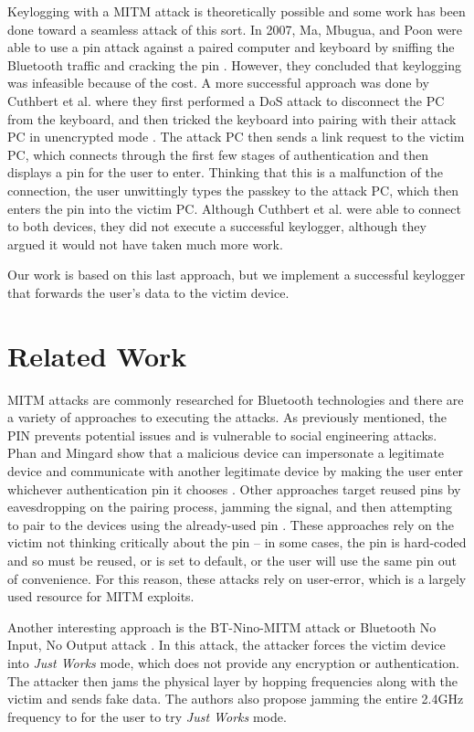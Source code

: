 \documentclass{acm_proc_article-sp}
\begin{document}
Keylogging with a MITM attack is theoretically possible and some work has been done toward a seamless attack of this sort. In 2007, Ma, Mbugua, and Poon were able to use a pin attack against a paired computer and keyboard by sniffing the Bluetooth traffic and cracking the pin \cite{ma2007keystroke}. However, they concluded that keylogging was infeasible because of the cost. A more successful approach was done by Cuthbert et al. where they first performed a DoS attack to disconnect the PC from the keyboard, and then tricked the keyboard into pairing with their attack PC in unencrypted mode \cite{cuthbertbluetooth}. The attack PC then sends a link request to the victim PC, which connects through the first few stages of authentication and then displays a pin for the user to enter. Thinking that this is a malfunction of the connection, the user unwittingly types the passkey to the attack PC, which then enters the pin into the victim PC. Although Cuthbert et al. were able to connect to both devices, they did not execute a successful keylogger, although they argued it would not have taken much more work. 

Our work is based on this last approach, but we implement a successful keylogger that forwards the user's data to the victim device.

\section{Related Work}
MITM attacks are commonly researched for Bluetooth technologies and there are a variety of approaches to executing the attacks. As previously mentioned, the PIN prevents potential issues and is vulnerable to social engineering attacks. Phan and Mingard show that a malicious device can impersonate a legitimate device and communicate with another legitimate device by making the user enter whichever authentication pin it chooses \cite{phan2012analyzing}. Other approaches target reused pins by eavesdropping on the pairing process, jamming the signal, and then attempting to pair to the devices using the already-used pin \cite{barnickel2012implementing,lindell2008attacks}. These approaches rely on the victim not thinking critically about the pin -- in some cases, the pin is hard-coded and so must be reused, or is set to default, or the user will use the same pin out of convenience. For this reason, these attacks rely on user-error, which is a largely used resource for MITM exploits.  

Another interesting approach is the BT-Nino-MITM attack or Bluetooth No Input, No Output attack \cite{4401672}
. In this attack, the attacker forces the victim device into \textit{Just Works} mode, which does not provide any encryption or authentication. The attacker then jams the physical layer by hopping frequencies along with the victim and sends fake data. The authors also propose jamming the entire 2.4GHz frequency to for the user to try \textit{Just Works} mode. 
\end{document}
